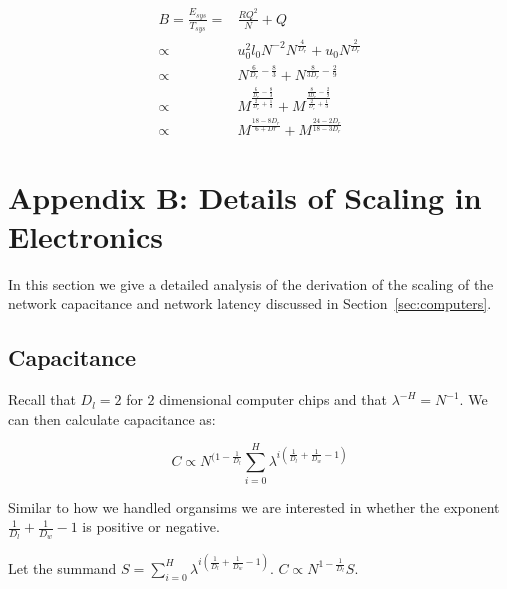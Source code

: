 \documentclass[12pt]{article}
\begin{document}
\begin{align*}
B = \frac{E_{sys}}{T_{sys}} =& \frac{RQ^2}{N} + Q \\
 \propto & u_0^2 l_0 N^{-2} N^{\frac{4}{D_r}} + u_0 N^{\frac{2}{D_r}} \\
 \propto & N^{\frac{6}{D_r}- \frac{8}{3}} + N^{\frac{8}{3 D_r} - \frac{2}{9}} \\
 \propto & M^{\frac{\frac{6}{D_r} - \frac{8}{3}}{\frac{2}{D_r} + \frac{1}{3}}}
 + M^{\frac{\frac{8}{3D_r} - \frac{2}{9}}{\frac{2}{D_r} + \frac{1}{3}} } \\
 \propto & M^{\frac{18-8D_r}{6+Dr}} + M^{\frac{24-2D_r}{18-3D_r}} 
\end{align*}

\newpage

\section{Appendix B: Details of Scaling in Electronics}
\label{sec:AppendixChips}

In this section we give a detailed analysis of the derivation of the scaling of
the network capacitance and network latency discussed in
Section~\ref{sec:computers}.

\subsection{Capacitance}

Recall that $D_l = 2$ for $2$ dimensional computer
chips and that $\lambda^{-H}=N^{-1}$. We can then calculate capacitance as:

\begin{equation}
  C \propto  N^{(1- \frac{1}{D_l}} \sum_{i=0}^H \lambda^{i \left( 
\frac{1}{D_l} + \frac{1}{D_w} -1 \right)}
\end{equation}

Similar to how we handled organsims we are interested in whether the exponent
$\frac{1}{D_l} + \frac{1}{D_w} -1$ is positive or negative.

Let the summand $S = \sum_{i=0}^H \lambda^{i(\frac{1}{D_l} +
\frac{1}{D_w}-1)}$. $C \propto
N^{1-\frac{1}{D_l}} S$. 
\end{document}
